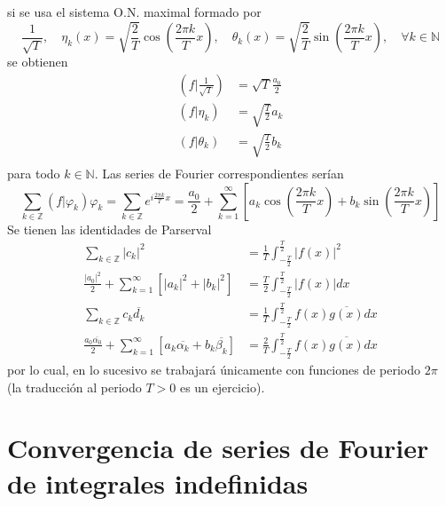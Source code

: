 \documentclass[12pt]{report}
\theoremstyle{largebreak}
\newcommand\abs[1]{\ensuremath{\left|#1\right|}}
\newcommand\pint[2]{\ensuremath{\left(#1\big| #2\right)}}
\begin{document}
    si se usa el sistema O.N. maximal formado por
    \begin{equation*}
        \frac{1}{\sqrt{T}},\quad\eta_k(x)=\sqrt{\frac{2}{T}}\cos\left(\frac{2\pi k}{T}x \right),\quad\theta_k(x)=\sqrt{\frac{2}{T}}\sin\left(\frac{2\pi k}{T}x \right),\quad\forall k\in\mathbb{N}
    \end{equation*}
    se obtienen
    \begin{equation*}
        \begin{split}
            \pint{f}{\frac{1}{\sqrt{T}}}&=\sqrt{T}\frac{a_0}{2}\\
            \pint{f}{\eta_k}&=\sqrt{\frac{T}{2}}a_k\\
            \pint{f}{\theta_k}&=\sqrt{\frac{T}{2}}b_k\\
        \end{split}
    \end{equation*}
    para todo $k\in\mathbb{N}$. Las series de Fourier correspondientes serían
    \begin{equation*}
        \sum_{ k\in\mathbb{Z}}\pint{f}{\varphi_k}\varphi_k=\sum_{ k\in\mathbb{Z}}e^{ i\frac{2\pi k}{T}x}=\frac{a_0}{2}+\sum_{ k=1}^\infty\left[a_k\cos\left(\frac{2\pi k}{T}x \right)+b_k\sin\left(\frac{2\pi k}{T}x \right) \right]
    \end{equation*}
    Se tienen las identidades de Parserval
    \begin{equation*}
        \begin{split}
            \sum_{ k\in\mathbb{Z}}\abs{c_k}^2&=\frac{1}{T}\int_{ -\frac{T}{2}}^{\frac{T}{2}}\abs{f(x)}^2\\
            \frac{\abs{a_0}^2}{2}+\sum_{ k=1}^\infty\left[\abs{a_k}^2+\abs{b_k}^2 \right]&=\frac{T}{2}\int_{ -\frac{T}{2}}^{\frac{T}{2}}\abs{f(x)}dx\\
            \sum_{ k\in\mathbb{Z}}c_k\overline{d_k}&=\frac{1}{T}\int_{ -\frac{T}{2}}^{\frac{T}{2}}f(x)\overline{g(x)}dx\\
            \frac{a_0\overline{\alpha_0}}{2}+\sum_{ k=1}^\infty\left[a_k\overline{\alpha_k}+b_k\overline{\beta_k} \right]&=\frac{2}{T}\int_{ -\frac{T}{2}}^{\frac{T}{2}}f(x)\overline{g(x)}dx
        \end{split}
    \end{equation*}
    por lo cual, en lo sucesivo se trabajará únicamente con funciones de periodo $2\pi$ (la traducción al periodo $T>0$ es un ejercicio).

    \section{Convergencia de series de Fourier de integrales indefinidas}
\end{document}
